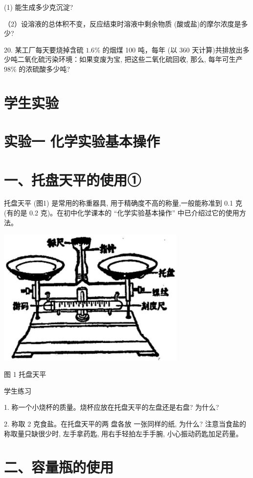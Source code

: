 \documentclass[10pt]{article}
\begin{document}
(1) 能生成多少克沉淀?

（2）设溶液的总体积不变，反应结束时溶液中剩余物质 (酸或盐)的摩尔浓度是多少?

20. 某工厂每天要烧掉含硫 \({1.6}\%\) 的烟煤 100 吨，每年 (以 360 天计算)共排放出多少吨二氧化硫污染环境：如果变废为宝, 把这些二氧化硫回收, 那么, 每年可生产 98\% 的浓硫酸多少吨?

\section*{学生实验}

\section*{实验一 化学实验基本操作}

\section*{一、托盘天平的使用①}

托盘天平 (图1) 是常用的称重器具, 用于精确度不高的称量,一般能称准到 0.1 克 (有的是 0.2 克)。在初中化学课本的 “化学实验基本操作” 中已介绍过它的使用方法。

\begin{center}
\includegraphics[max width=0.7\textwidth]{images/01912d0f-097c-7e75-8f32-4f326cd86c9f_152_999985.jpg}
\end{center}

图 1 托盘天平

学生练习

1. 称一个小烧杯的质量。烧杯应放在托盘天平的左盘还是右盘? 为什么?

2. 称取 2 克食盐。在托盘天平的两 盘各放 一张同样的纸, 为什么? 注意当食盐的称取量只缺很少时, 左手拿药匙, 用右手轻拍左手手腕, 小心振动药匙加足药量。

\section*{二、容量瓶的使用}
\end{document}

